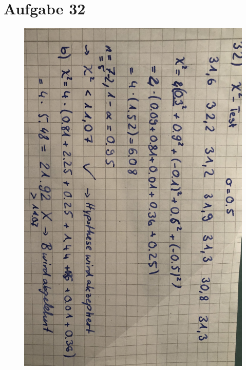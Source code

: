 \section*{Aufgabe 32}
\label{sec:Aufgabe4}
\begin{figure}
\includegraphics[keepaspectratio,width=\textwidth]{content/images/4.jpeg}
\end{figure}